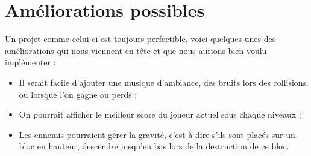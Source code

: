 \documentclass[a4paper,12pt]{report}
\begin{document}
\section{Améliorations possibles}
Un projet comme celui-ci est toujours perfectible, voici quelques-unes des améliorations 
qui nous viennent en tête et que nous aurions bien voulu implémenter :\\
\begin{itemize}
  \item Il serait facile d'ajouter une musique d'ambiance, des bruits lors des 
  collisions ou lorsque l'on gagne ou perds ;
  \item On pourrait afficher le meilleur score du joueur actuel sous chaque niveaux ;
  \item Les ennemis pourraient gérer la gravité, c'est à dire s'ils sont placés 
      sur un bloc en hauteur, descendre jusqu'en bas lors de la destruction de ce bloc.
\end{itemize}
\end{document}
